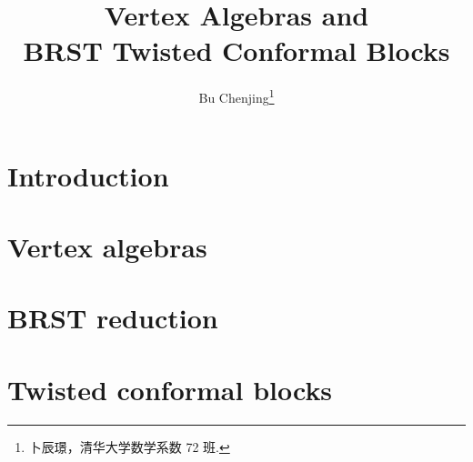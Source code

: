 \documentclass[twoside]{article}
\begin{document}
\title{Vertex Algebras and\\BRST Twisted Conformal Blocks}
\author{Bu Chenjing\footnote{卜辰璟，清华大学数学系数 72 班.}}

\begin{abstract}
     
\end{abstract}

\tableofcontents

\section{Introduction} \label{sect-0}



\section{Vertex algebras} \label{sect-1}



\section{BRST reduction} \label{sect-2}



\section{Twisted conformal blocks} \label{sect-3}



\printbibliography
\end{document}
